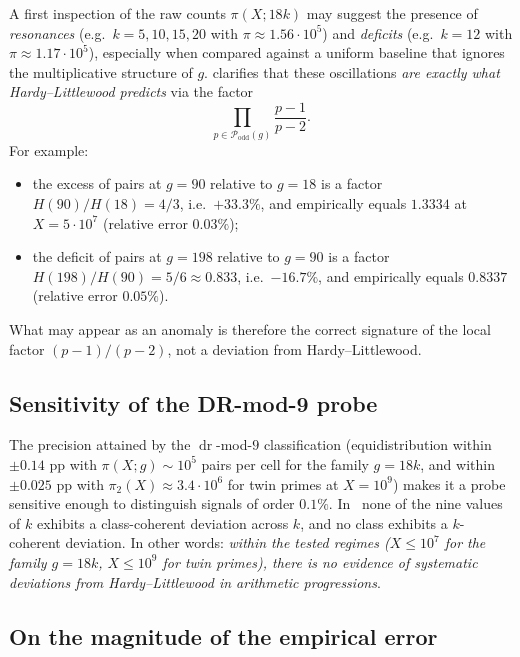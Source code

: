 \documentclass[11pt]{amsart}
\theoremstyle{plain}
\theoremstyle{definition}
\theoremstyle{remark}
\DeclareMathOperator{\dr}{dr}
\begin{document}
A first inspection of the raw counts $\pi(X;18k)$ may suggest the
presence of \emph{resonances} (e.g.\ $k = 5,10,15,20$ with
$\pi \approx 1.56 \cdot 10^5$) and \emph{deficits} (e.g.\ $k=12$ with
$\pi \approx 1.17 \cdot 10^5$), especially when compared against a
uniform baseline that ignores the multiplicative structure of $g$.
 clarifies that these oscillations \emph{are
exactly what Hardy--Littlewood predicts} via the factor
\[
  \prod_{p \in \mathcal{P}_{\mathrm{odd}}(g)} \frac{p-1}{p-2}.
\]
For example:
\begin{itemize}
\item the excess of pairs at $g=90$ relative to $g=18$ is a factor
  $H(90)/H(18) = 4/3$, i.e.\ $+33.3\%$, and empirically equals
  $1.3334$ at $X=5\cdot 10^7$ (relative error $0.03\%$);
\item the deficit of pairs at $g=198$ relative to $g=90$ is a factor
  $H(198)/H(90) = 5/6 \approx 0.833$, i.e.\ $-16.7\%$, and
  empirically equals $0.8337$ (relative error $0.05\%$).
\end{itemize}
What may appear as an anomaly is therefore the correct signature of
the local factor $(p-1)/(p-2)$, not a deviation from
Hardy--Littlewood.

\subsection{Sensitivity of the DR-mod-9 probe}

The precision attained by the $\dr$-mod-$9$ classification
(equidistribution within $\pm 0.14$ pp with $\pi(X;g) \sim 10^5$ pairs
per cell for the family $g=18k$, and within $\pm 0.025$ pp with
$\pi_2(X) \approx 3.4 \cdot 10^6$ for twin primes at $X = 10^9$)
makes it a probe sensitive enough to distinguish signals of order
$0.1\%$. In~ none of the nine values of $k$
exhibits a class-coherent deviation across $k$, and no class exhibits
a $k$-coherent deviation. In other words: \emph{within the tested
regimes ($X \le 10^7$ for the family $g=18k$, $X \le 10^9$ for twin
primes), there is no evidence of systematic deviations from
Hardy--Littlewood in arithmetic progressions}.

\subsection{On the magnitude of the empirical error}\label{ssec:magnitude_error}
\end{document}
